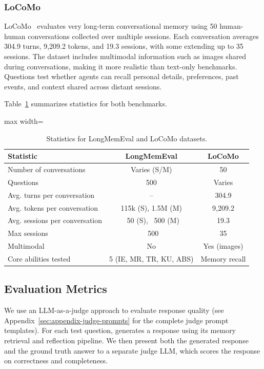 \subsubsection{LoCoMo}

LoCoMo~\cite{maharana2024evaluating} evaluates very long-term conversational memory using 50 human-human conversations collected over multiple sessions. Each conversation averages 304.9 turns, 9,209.2 tokens, and 19.3 sessions, with some extending up to 35 sessions. The dataset includes multimodal information such as images shared during conversations, making it more realistic than text-only benchmarks. Questions test whether agents can recall personal details, preferences, past events, and context shared across distant sessions. 

Table~\ref{tab:datasets} summarizes statistics for both benchmarks.

\begin{table}[t]
\centering
\footnotesize
\begin{adjustbox}{max width=\textwidth}
\begin{tabular}{lcc}
\hline
\textbf{Statistic} & \textbf{LongMemEval} & \textbf{LoCoMo} \\
\hline
Number of conversations & Varies (S/M) & 50 \\
Questions & 500 & Varies \\
Avg. turns per conversation & -- & 304.9 \\
Avg. tokens per conversation & 115k (S), 1.5M (M) & 9,209.2 \\
Avg. sessions per conversation & ~50 (S), ~500 (M) & 19.3 \\
Max sessions & ~500 & 35 \\
Multimodal & No & Yes (images) \\
Core abilities tested & 5 (IE, MR, TR, KU, ABS) & Memory recall \\
\hline
\end{tabular}
\end{adjustbox}
\caption{Statistics for LongMemEval and LoCoMo datasets.}
\label{tab:datasets}
\end{table}

\subsection{Evaluation Metrics}

We use an LLM-as-a-judge approach to evaluate response quality (see Appendix~\ref{sec:appendix-judge-prompts} for the complete judge prompt templates). For each test question, \our generates a response using its memory retrieval and reflection pipeline. We then present both the generated response and the ground truth answer to a separate judge LLM, which scores the response on correctness and completeness.

